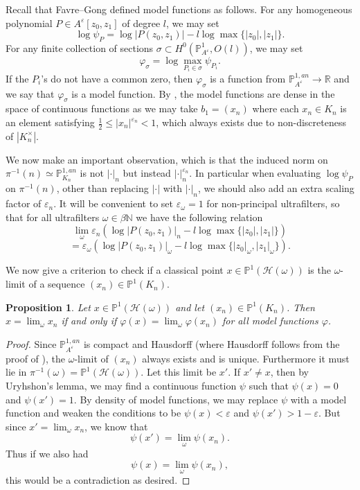 \documentclass[10pt]{amsart}
\newcommand{\bb}{\mathbb}
\newcommand{\vphi}{\varphi}
\newcommand{\berkP}{\mathbb{P}^{1,an}}
\newcommand{\cal}{\mathcal}
\newcommand{\eps}{\varepsilon}
\numberwithin{theorem}{section}
\newtheorem{proposition}[theorem]{Proposition}
\numberwithin{example}{section}
\numberwithin{definition}{section}
\begin{document}
Recall that Favre--Gong defined model functions as follows. For any homogeneous polynomial $P \in A^{\eps}[z_0,z_1]$ of degree $l$, we may set
$$\log \psi_P = \log |P(z_0,z_1)| - l \log \max\{|z_0|,|z_1|\}.$$
For any finite collection of sections $\sigma \subset H^0(\bb{P}^1_{A^{\eps}}, O(l))$, we may set
$$\vphi_{\sigma} = \log \max_{P_i \in \sigma} \psi_{P_i}.$$
If the $P_i$'s do not have a common zero, then $\vphi_{\sigma}$ is a function from $\berkP_{A^{\eps}} \to \bb{R}$ and we say that $\vphi_{\sigma}$ is a model function. By \cite[Theorem 4.8]{FG24}, the model functions are dense in the space of continuous functions as we may take $b_1 = (x_n)$ where each $x_n \in K_n$ is an element satisfying $\frac{1}{2} \leq |x_n|^{\eps_n} < 1$, which always exists due to non-discreteness of $|K_n^{\times}|$.
\par 
We now make an important observation, which is that the induced norm on $\pi^{-1}(n) \simeq \berkP_{K_n}$ is not $| \cdot |_n$ but instead $| \cdot |_n^{\eps_n}$. In particular when evaluating $\log \psi_P$ on $\pi^{-1}(n)$, other than replacing $| \cdot |$ with $| \cdot |_n$, we should also add an extra scaling factor of $\eps_n$. It will be convenient to set $\eps_{\omega} = 1$ for non-principal ultrafilters, so that for all ultrafilters $\omega \in \beta \bb{N}$ we have the following relation 
$$\lim_{\omega} \eps_n \left(\log |P(z_0,z_1)|_n - l \log \max \{|z_0|,|z_1|\} \right) $$
$$= \eps_{\omega} \left(\log |P(z_0,z_1)|_{\omega} - l \log \max\{ |z_0|_{\omega},|z_1|_{\omega}\}\right).$$
\par 
We now give a criterion to check if a classical point $x \in \bb{P}^1(\cal{H}(\omega))$ is the $\omega$-limit of a sequence $(x_n) \in \bb{P}^1(K_n)$. 

\begin{proposition} \label{LimitCriterion1}
Let $x \in \bb{P}^1(\cal{H}(\omega))$ and let $(x_n) \in \bb{P}^1(K_n)$. Then $x = \lim_{\omega} x_n$ if and only if $\vphi(x) = \lim_{\omega} \vphi(x_n)$ for all model functions $\vphi$. 
\end{proposition}

\begin{proof}
Since $\berkP_{A^{\eps}}$ is compact and Hausdorff (where Hausdorff follows from the proof of \cite[Theorem 4.8]{FG24}), the $\omega$-limit of $(x_n)$ always exists and is unique. Furthermore it must lie in $\pi^{-1}(\omega) = \bb{P}^1(\cal{H}(\omega))$. Let this limit be $x'$. If $x' \not = x$, then by Uryhshon's lemma, we may find a continuous function $\psi$ such that $\psi(x) = 0$ and $\psi(x') = 1$. By density of model functions, we may replace $\psi$ with a model function and weaken the conditions to be $\psi(x) < \eps$ and $\psi(x') > 1-\eps$. But since $x' = \lim_{\omega} x_n$, we know that 
$$\psi(x') = \lim_{\omega} \psi(x_n).$$
Thus if we also had 
$$\psi(x) = \lim_{\omega} \psi(x_n),$$
this would be a contradiction as desired. 
\end{proof}
\end{document}
